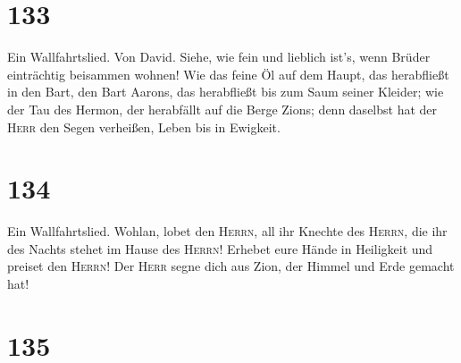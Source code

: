 \hypertarget{section-132}{%
\section{133}\label{section-132}}

 Ein Wallfahrtslied. Von David. Siehe, wie fein und
lieblich ist's, wenn Brüder einträchtig beisammen wohnen! 
Wie das feine Öl auf dem Haupt, das herabfließt in den Bart, den Bart
Aarons, das herabfließt bis zum Saum seiner Kleider;  wie
der Tau des Hermon, der herabfällt auf die Berge Zions; denn daselbst
hat der \textsc{Herr} den Segen verheißen, Leben bis in Ewigkeit.

\hypertarget{section-133}{%
\section{134}\label{section-133}}

 Ein Wallfahrtslied. Wohlan, lobet den \textsc{Herrn}, all
ihr Knechte des \textsc{Herrn}, die ihr des Nachts stehet im Hause des
\textsc{Herrn}!  Erhebet eure Hände in Heiligkeit und
preiset den \textsc{Herrn}!  Der \textsc{Herr} segne dich
aus Zion, der Himmel und Erde gemacht hat!

\hypertarget{section-134}{%
\section{135}\label{section-134}}


